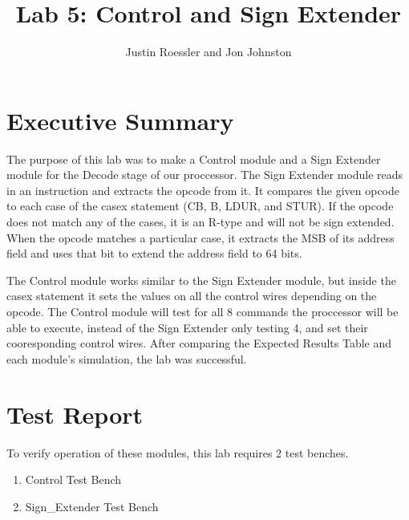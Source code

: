 \documentclass{article}
\author{Justin Roessler and Jon Johnston}
\title{Lab 5: Control and Sign Extender}
\begin{document}
\maketitle

\section{Executive Summary}
The purpose of this lab was to make a Control module and a Sign Extender
module for the Decode stage of our proccessor. The Sign Extender module reads in an instruction and extracts the opcode from it. It compares the given opcode to each case of the casex statement (CB, B, LDUR, and STUR). If the opcode does not match any of the cases, it is an R-type and will not be sign extended. When the opcode matches a particular case, it extracts the MSB of its address field and uses that bit to extend the address field to 64 bits.

The Control module works similar to the Sign Extender module, but inside the casex statement it sets the values on all the control wires depending on the opcode. The Control module will test for all 8 commands the proccessor will be able to execute, instead of the Sign Extender only testing 4, and set their cooresponding control wires. After comparing the Expected Results Table and each module's simulation, the lab was successful.	

\section{Test Report}
To verify operation of these modules, this lab requires 2 test benches.
\begin{enumerate}
	\item Control Test Bench
	\item Sign\_Extender Test Bench
\end{enumerate}

\end{document}
